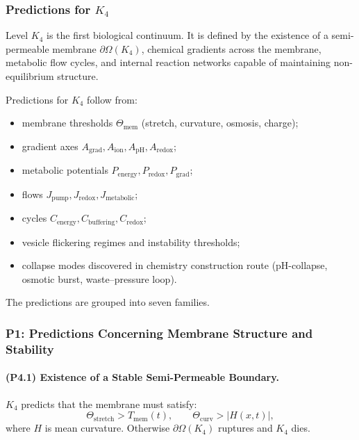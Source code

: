 

\subsubsection{Predictions for \texorpdfstring{$K_4$}{K_4}}
\label{sec:predictions-k4}

Level $K_4$ is the first biological continuum.
It is defined by the existence of a semi-permeable membrane $\partial\Omega(K_4)$,
chemical gradients across the membrane, metabolic flow cycles, and internal
reaction networks capable of maintaining non-equilibrium structure.

Predictions for $K_4$ follow from:
\begin{itemize}
    \item membrane thresholds $\Theta_{\mathrm{mem}}$ (stretch, curvature, osmosis, charge);
    \item gradient axes $A_{\mathrm{grad}},A_{\mathrm{ion}},A_{\mathrm{pH}},A_{\mathrm{redox}}$;
    \item metabolic potentials $P_{\mathrm{energy}},P_{\mathrm{redox}},P_{\mathrm{grad}}$;
    \item flows $J_{\mathrm{pump}},J_{\mathrm{redox}},J_{\mathrm{metabolic}}$;
    \item cycles $C_{\mathrm{energy}},C_{\mathrm{buffering}},C_{\mathrm{redox}}$;
    \item vesicle flickering regimes and instability thresholds;
    \item collapse modes discovered in chemistry construction route (pH-collapse, osmotic burst, waste–pressure loop).
\end{itemize}

The predictions are grouped into seven families.

\subsubsection{P1: Predictions Concerning Membrane Structure and Stability}

\paragraph{(P4.1) Existence of a Stable Semi-Permeable Boundary.}
$K_4$ predicts that the membrane must satisfy:
\[
\Theta_{\mathrm{stretch}} > T_{\mathrm{mem}}(t), \qquad
\Theta_{\mathrm{curv}} > |H(x,t)|,
\]
where $H$ is mean curvature.
Otherwise $\partial\Omega(K_4)$ ruptures and $K_4$ dies.

